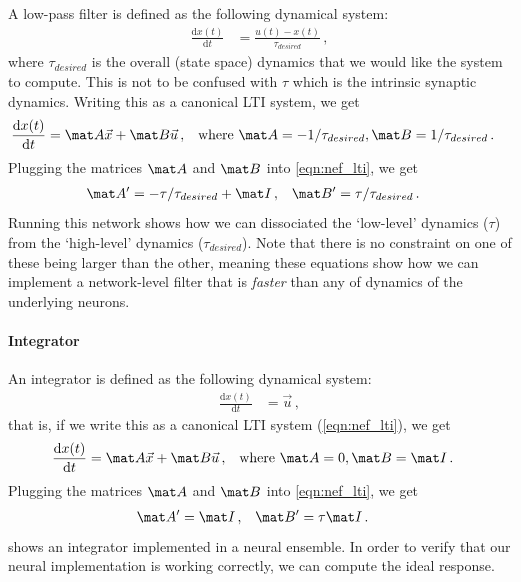 \documentclass[10pt,letterpaper,oneside]{article}
\begin{document}
A low-pass filter is defined as the following dynamical system:
\begin{align*}
	\frac{\mathrm{d} x(t)}{\mathrm{d}t} &= \frac {u(t)-x(t)}{\tau_{desired}} \,,
\end{align*}
where $\tau_{desired}$ is the overall (state space) dynamics that we would like the system to compute. This is not to be confused with $\tau$ which is the intrinsic synaptic dynamics. Writing this as a canonical LTI system, we get
\begin{align*}
	\frac{\mathrm{d} x(t)}{\mathrm{d}t} &= \mat A \vec x + \mat B \vec u \,, && \text{where } \mat A = -1/\tau_{desired}, \mat B = 1/\tau_{desired} \,.
\end{align*}
Plugging the matrices $\mat A$ and $\mat B$ into \cref{eqn:nef_lti}, we get
\begin{align*}
	\mat A' &= -\tau/\tau_{desired} + \mat I \,, & \mat B' &= \tau/\tau_{desired} \,.
\end{align*}
Running this network shows how we can dissociated the `low-level' dynamics ($\tau$) from the `high-level' dynamics ($\tau_{desired}$). Note that there is no constraint on one of these being larger than the other, meaning these equations show how we can implement a network-level filter  that is \emph{faster} than any of dynamics of the underlying neurons.

\paragraph{Integrator}

An integrator is defined as the following dynamical system:
\begin{align*}
	\frac{\mathrm{d} x(t)}{\mathrm{d}t} &= \vec u \,,
\end{align*}
that is, if we write this as a canonical LTI system (\cref{eqn:nef_lti}), we get
\begin{align*}
	\frac{\mathrm{d} x(t)}{\mathrm{d}t} &= \mat A \vec x + \mat B \vec u \,, && \text{where } \mat A = 0, \mat B = \mat I \,.
\end{align*}
Plugging the matrices $\mat A$ and $\mat B$ into \cref{eqn:nef_lti}, we get
\begin{align*}
	\mat A' &= \mat I \,, & \mat B' &= \tau \mat I \,.
\end{align*}
 shows an integrator implemented in a neural ensemble. In order to verify that our neural implementation is working correctly, we can compute the ideal response.
\end{document}
